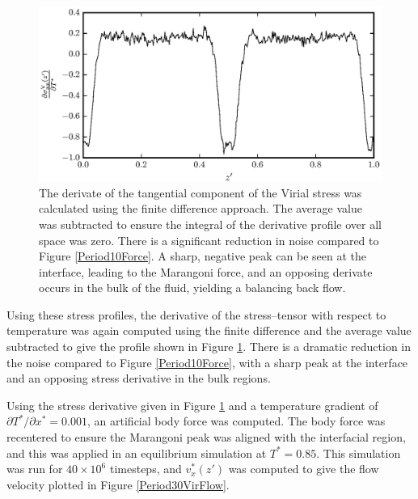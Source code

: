 \begin{figure}[h]
\centering
\includegraphics[scale=1.0]{Period30VirForce}
\caption{The derivate of the tangential component of the Virial stress was calculated using the finite difference approach.
The average value was subtracted to ensure the integral of the derivative profile over all space was zero.
There is a significant reduction in noise compared to Figure \ref{Period10Force}.
A sharp, negative peak can be seen at the interface, leading to the Marangoni force, and an opposing derivate occurs in the bulk of the fluid, yielding a balancing back flow.
}
\label{Period30VirForce}
\end{figure}

Using these stress profiles, the derivative of the stress--tensor with respect to temperature was again computed using the finite difference and the average value subtracted to give the profile shown in Figure \ref{Period30VirForce}.
There is a dramatic reduction in the noise compared to Figure \ref{Period10Force}, with a sharp peak at the interface and an opposing stress derivative in the bulk regions.
\FloatBarrier

Using the stress derivative given in Figure \ref{Period30VirForce} and a temperature gradient of $\partial T^{*} / \partial x^{*} = 0.001$, an artificial body force was computed.
The body force was recentered to ensure the Marangoni peak was aligned with the interfacial region, and this was applied in an equilibrium simulation at $T^{*} = 0.85$.
This simulation was run for $40 \times 10^{6}$ timesteps, and $v^{*}_x(z')$ was computed to give the flow velocity plotted in Figure \ref{Period30VirFlow}.

